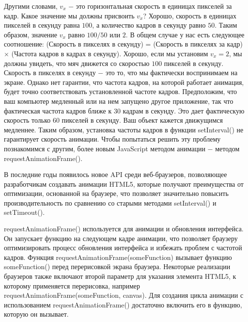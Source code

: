 Другими словами, $v_x$ $-$ это горизонтальная скорость в единицах пикселей за кадр. Какое значение мы должны присвоить $v_x$? Хорошо, скорость в единицах пикселей в секунду равна $100$, а количество кадров в секунду равно $50$. Таким образом, значение $v_x$ равно $100/50$ или $2$. В общем случае у нас есть следующее соотношение: (Скорость в пикселях в секунду) = (Скорость в пикселях за кадр) $×$ (Частота кадров в кадрах в секунду). Хорошо, если мы установим $v_x = 2$, мы должны увидеть, что мяч движется со скоростью $100$ пикселей в секунду. Скорость в пикселях в секунду $-$ это то, что мы фактически воспринимаем на экране. Однако нет гарантии, что частота кадров, на которой работает анимация, будет точно соответствовать установленной частоте кадров. Предположим, что ваш компьютер медленный или на нем запущено другое приложение, так что фактическая частота кадров ближе к $30$ кадрам в секунду. Это дает фактическую скорость только $60$ пикселей в секунду. Ваш объект кажется движущимся медленнее. Таким образом, установка частоты кадров в функции setInterval() не гарантирует скорость анимации. Чтобы попытаться решить эту проблему познакомимся с другим, более новым JavaScript методом анимации $-$ методом requestAnimationFrame(). \cite{canvas14}

В последние годы появилось новое API среди веб-браузеров, позволяющее разработчикам создавать анимации HTML5, которые получают преимущества от оптимизации, основанной на браузере, что позволяет значительно повысить производительность по сравнению со старыми методами setInterval() и setTimeout().

requestAnimationFrame() используется для анимации и обновления интерфейса. Он запускает функцию на следующем кадре анимации, что позволяет браузеру оптимизировать процесс обновления интерфейса и избежать проблем с частотой кадров. Функция requestAnimationFrame(someFunction) вызывает функцию someFunction() перед перерисовкой экрана браузера. Некоторые реализации браузеров также включают второй параметр для указания элемента HTML5, к которому применяется перерисовка, например requestAnimationFrame(someFunction, canvas). Для создания цикла анимации с использованием requestAnimationFrame() достаточно включить его в функцию, которую он вызывает.


